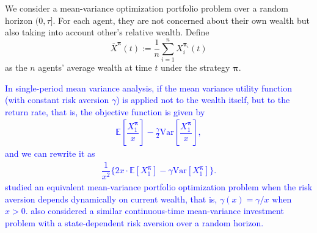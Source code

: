 \documentclass[11pt]{article}
\newcommand \E {\mathbb{E}}
\newcommand \gam {\gamma}
\numberwithin{equation}{section}
\newcommand{\blue}[1]{\textcolor{blue}{#1}}
\newcommand{\bpi}{\boldsymbol{\pi}}
\begin{document}
We consider a mean-variance optimization portfolio problem over a random horizon $(0, \tau]$. For each agent, they are not concerned about their own wealth but also taking into account other's relative wealth. Define
	$$\overline{X}^{\bpi}(t):=\frac{1}{n}\sum_{i = 1}^{n}X^{\bpi_i}_i(t)$$
as the $n$ agents' average wealth at time $t$ under the strategy $\bpi$.

\blue{
In single-period mean variance analysis, if the mean variance utility
function (with constant risk aversion $\gam$) is applied not to the wealth itself, but to
the return rate, that is, the objective function is given by
\begin{align}
\E\left[\dfrac{X^{\bpi}_1}{x}\right] - \frac{\gam}{2}\text{Var}\left[\dfrac{X^{\bpi}_1}{x}\right],
\end{align}
and we can rewrite it as
\begin{align}
\dfrac{1}{x^2} \Big\{ 2 x \cdot \E[X^{\bpi}_1] - {\gam} \text{Var}[X^{\bpi}_1] \Big\}.
\end{align}
\citet{bjork2014mean} studied an equivalent mean-variance portfolio optimization problem when the risk aversion depends dynamically on current wealth, that is, $\gam(x) = \gam/x$ when $x>0$. \citet{landriault2018equilibrium} also considered a similar continuous-time mean-variance investment problem with a state-dependent risk aversion over a random horizon.}
\end{document}
